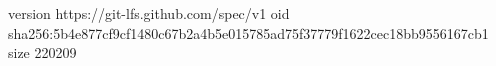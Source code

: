 version https://git-lfs.github.com/spec/v1
oid sha256:5b4e877cf9cf1480c67b2a4b5e015785ad75f37779f1622cec18bb9556167cb1
size 220209
